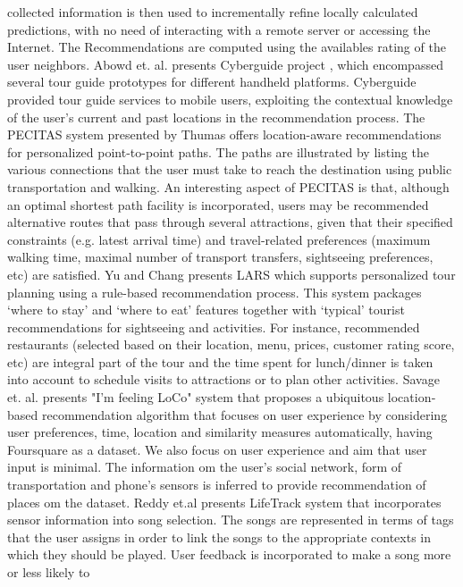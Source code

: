 collected information is then used to incrementally refine locally
calculated predictions, with no need of interacting with a remote
server or accessing the Internet. The Recommendations are computed
using the availables rating of the user neighbors.
Abowd et. al. presents Cyberguide project \cite{abowd1997cyberguide},
which encompassed several tour guide prototypes for different handheld
platforms. Cyberguide provided tour guide services to mobile users,
exploiting the contextual knowledge of the user’s current and past
locations in the recommendation process. The PECITAS system
\cite{tumas2009personalized} presented by Thumas offers location-aware
recommendations for personalized point-to-point paths. The paths are
illustrated by listing the various connections that the user must take
to reach the destination using public transportation and walking. An
interesting aspect of PECITAS is that, although an optimal shortest 
path facility is incorporated, users may be recommended alternative 
routes that pass through several attractions, given that
their specified constraints (e.g. latest arrival time) and travel-related 
preferences (maximum walking time, maximal number of transport
transfers, sightseeing preferences, etc) are satisfied. Yu and Chang
presents LARS \cite{yu2009personalized} which supports personalized
tour planning using a rule-based recommendation process. This system
packages ‘where to stay’ and ‘where to eat’ features together with
‘typical’ tourist recommendations for sightseeing and activities. For
instance, recommended restaurants (selected based on their location,
menu, prices, customer rating score, etc) are integral part of the
tour and the time spent for lunch/dinner is taken into account to
schedule visits to attractions or to plan other activities.
Savage et. al. presents  "I'm feeling LoCo" system \cite{savage2012m}
that proposes a ubiquitous location­ based recommendation algorithm
that focuses on user experience by considering user preferences, time,
location and similarity measures automatically, having Foursquare as a
dataset. We also focus on user experience and aim that user input is
minimal. The information  om the user's social network, form of
transportation and phone's sensors is inferred to provide
recommendation of places  om the dataset.
Reddy et.al\cite{reddy2006lifetrak} presents LifeTrack system that
incorporates sensor information into song selection. The songs are
represented in terms of tags that the user assigns in order to link
the songs to the appropriate contexts in which they should be played.
User feedback is incorporated to make a song more or less likely to
